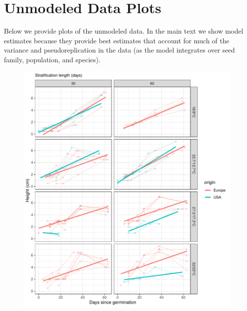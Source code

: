 \documentclass[12pt]{article}\usepackage[]{graphicx}\usepackage[]{color}
\begin{document}
\section{Unmodeled Data Plots}
Below we provide plots of the unmodeled data. In the main text we show model estimates because they provide best estimates that account for much of the variance and pseudoreplication in the data (as the model integrates over seed family, population, and species). %
\begin{figure}[H]
  \centering
  {\includegraphics[scale=.5, page=1, trim=0cm 0cm 2.9cm 0cm, clip=TRUE]{supplement.pdf}}

\end{figure}
\end{document}
